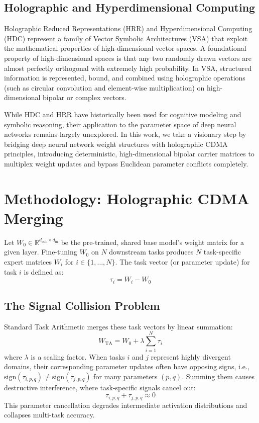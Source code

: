 \documentclass{article}
\begin{document}
\subsection{Holographic and Hyperdimensional Computing}
Holographic Reduced Representations (HRR) \cite{plate1995holographic} and Hyperdimensional Computing (HDC) \cite{kanerva2009hyperdimensional} represent a family of Vector Symbolic Architectures (VSA) that exploit the mathematical properties of high-dimensional vector spaces. A foundational property of high-dimensional spaces is that any two randomly drawn vectors are almost perfectly orthogonal with extremely high probability. In VSA, structured information is represented, bound, and combined using holographic operations (such as circular convolution and element-wise multiplication) on high-dimensional bipolar or complex vectors. 

While HDC and HRR have historically been used for cognitive modeling and symbolic reasoning, their application to the parameter space of deep neural networks remains largely unexplored. In this work, we take a visionary step by bridging deep neural network weight structures with holographic CDMA principles, introducing deterministic, high-dimensional bipolar carrier matrices to multiplex weight updates and bypass Euclidean parameter conflicts completely.

\section{Methodology: Holographic CDMA Merging}
\label{sec:method}
Let $W_0 \in \mathbb{R}^{d_{\text{out}} \times d_{\text{in}}}$ be the pre-trained, shared base model's weight matrix for a given layer. Fine-tuning $W_0$ on $N$ downstream tasks produces $N$ task-specific expert matrices $W_i$ for $i \in \{1, \ldots, N\}$. The task vector (or parameter update) for task $i$ is defined as:
\begin{equation}
    \tau_i = W_i - W_0
\end{equation}

\subsection{The Signal Collision Problem}
Standard Task Arithmetic merges these task vectors by linear summation:
\begin{equation}
    W_{\text{TA}} = W_0 + \lambda \sum_{i=1}^N \tau_i
\end{equation}
where $\lambda$ is a scaling factor. When tasks $i$ and $j$ represent highly divergent domains, their corresponding parameter updates often have opposing signs, i.e., $\text{sign}(\tau_{i, p, q}) \neq \text{sign}(\tau_{j, p, q})$ for many parameters $(p, q)$. Summing them causes destructive interference, where task-specific signals cancel out:
\begin{equation}
    \tau_{i, p, q} + \tau_{j, p, q} \approx 0
\end{equation}
This parameter cancellation degrades intermediate activation distributions and collapses multi-task accuracy.
\end{document}
